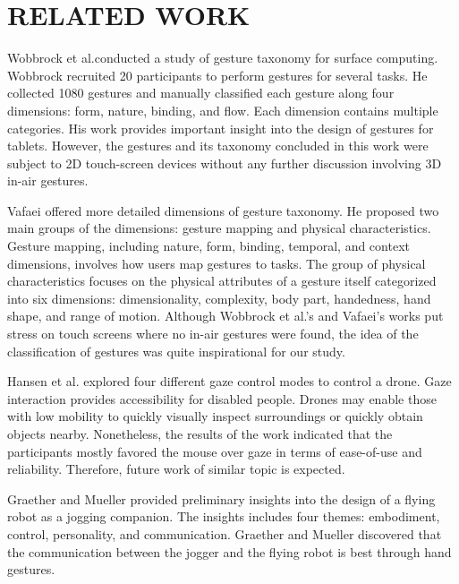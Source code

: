 \documentclass{sigchi}
\begin{document}
\section{RELATED WORK}

Wobbrock et al.\cite{Wobbrock:2009:UGS:1518701.1518866}conducted a study of gesture taxonomy for surface computing. Wobbrock recruited 20 participants to perform gestures for several tasks. He collected 1080 gestures and manually classified each gesture along four dimensions: form, nature, binding, and flow. Each dimension contains multiple categories. His work provides important insight into the design of gestures for tablets. However, the gestures and its taxonomy concluded in this work were subject to 2D touch-screen devices without any further discussion involving 3D in-air gestures.

Vafaei \cite{Vafaei:2013} offered more detailed dimensions of gesture taxonomy. He proposed two main groups of the dimensions: gesture mapping and physical characteristics. Gesture mapping, including nature, form, binding, temporal, and context dimensions, involves how users map gestures to tasks. The group of physical characteristics focuses on the physical attributes of a gesture itself categorized into six dimensions: dimensionality, complexity, body part, handedness, hand shape, and range of motion. Although Wobbrock et al.'s and Vafaei's works put stress on touch screens where no in-air gestures were found, the idea of the classification of gestures was quite inspirational for our study.

Hansen et al.\cite{Hansen:2014:UGC:2578153.2578156} explored four different gaze control modes to control a drone. Gaze interaction provides accessibility for disabled people. Drones may enable those with low mobility to quickly visually inspect surroundings or quickly obtain objects nearby. Nonetheless, the results of the work indicated that the participants mostly favored the mouse over gaze in terms of ease-of-use and reliability. Therefore, future work of similar topic is expected.

Graether and Mueller \cite{Graether:2012:JFR:2212776.2212386} provided preliminary insights into the design of a flying robot as a jogging companion. The insights includes four themes: embodiment, control, personality, and communication. Graether and Mueller discovered that the communication between the jogger and the flying robot is best through hand gestures.
\end{document}
